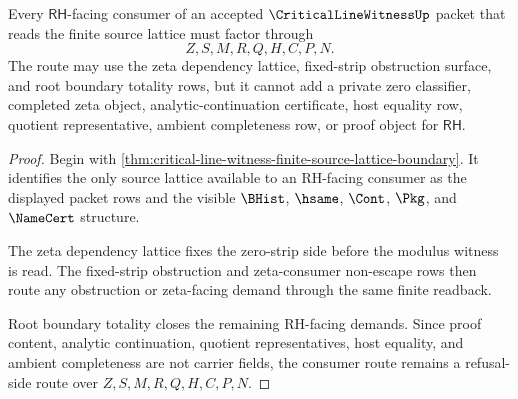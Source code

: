 \begin{theorem}
\label{thm:critical-line-witness-rh-consumer-route}
Every $\mathsf{RH}$-facing consumer of an accepted $\CriticalLineWitnessUp$ packet that reads the finite source lattice must factor through
$$
Z,S,M,R,Q,H,C,P,N.
$$
The route may use the zeta dependency lattice, fixed-strip obstruction surface, and root boundary totality rows, but it cannot add a private zero classifier, completed zeta object, analytic-continuation certificate, host equality row, quotient representative, ambient completeness row, or proof object for $\mathsf{RH}$.
\end{theorem}
\begin{proof}
Begin with \autoref{thm:critical-line-witness-finite-source-lattice-boundary}. It identifies the only source lattice available to an RH-facing consumer as the displayed packet rows and the visible $\BHist$, $\hsame$, $\Cont$, $\Pkg$, and $\NameCert$ structure.

The zeta dependency lattice fixes the zero-strip side before the modulus witness is read. The fixed-strip obstruction and zeta-consumer non-escape rows then route any obstruction or zeta-facing demand through the same finite readback.

Root boundary totality closes the remaining RH-facing demands. Since proof content, analytic continuation, quotient representatives, host equality, and ambient completeness are not carrier fields, the consumer route remains a refusal-side route over $Z,S,M,R,Q,H,C,P,N$.
\end{proof}

